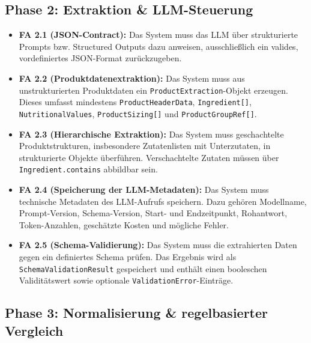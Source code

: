 \documentclass[11pt,a4paper]{article}
\begin{document}
\subsection{Phase 2: Extraktion \& LLM-Steuerung}

\begin{itemize}[leftmargin=*]
    \item \textbf{FA 2.1 (JSON-Contract):} Das System muss das LLM über strukturierte Prompts bzw. Structured Outputs dazu anweisen, ausschließlich ein valides, vordefiniertes JSON-Format zurückzugeben.
    
    \item \textbf{FA 2.2 (Produktdatenextraktion):} Das System muss aus unstrukturierten Produktdaten ein \texttt{ProductExtraction}-Objekt erzeugen. Dieses umfasst mindestens \texttt{ProductHeaderData}, \texttt{Ingredient[]}, \texttt{NutritionalValues}, \texttt{ProductSizing[]} und \texttt{ProductGroupRef[]}.
    
    \item \textbf{FA 2.3 (Hierarchische Extraktion):} Das System muss geschachtelte Produktstrukturen, insbesondere Zutatenlisten mit Unterzutaten, in strukturierte Objekte überführen. Verschachtelte Zutaten müssen über \texttt{Ingredient.contains} abbildbar sein.
    
    \item \textbf{FA 2.4 (Speicherung der LLM-Metadaten):} Das System muss technische Metadaten des LLM-Aufrufs speichern. Dazu gehören Modellname, Prompt-Version, Schema-Version, Start- und Endzeitpunkt, Rohantwort, Token-Anzahlen, geschätzte Kosten und mögliche Fehler.
    
    \item \textbf{FA 2.5 (Schema-Validierung):} Das System muss die extrahierten Daten gegen ein definiertes Schema prüfen. Das Ergebnis wird als \texttt{SchemaValidationResult} gespeichert und enthält einen booleschen Validitätswert sowie optionale \texttt{ValidationError}-Einträge.
\end{itemize}

\subsection{Phase 3: Normalisierung \& regelbasierter Vergleich}
\end{document}
